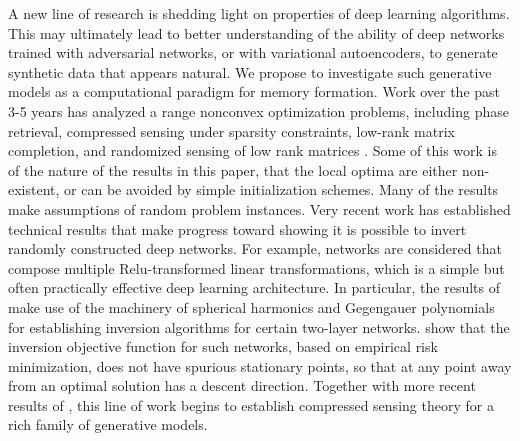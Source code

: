 A new line of research is shedding light on properties of deep
learning algorithms. This may ultimately lead to better understanding
of the ability of deep networks trained with adversarial networks, or
with variational autoencoders, to generate synthetic data that appears
natural. We propose to investigate such generative models as a
computational paradigm for memory formation. 
Work over the past 3-5 years has analyzed a range nonconvex
optimization problems, including phase retrieval, compressed
sensing under sparsity constraints, low-rank matrix
completion, and randomized sensing of low rank matrices
\cite{phaselift_1,phaselift_2,phaselift_3,ZhaWanLiu15,WeiCaiCha16,ZheLaf15,phaselift_1,phaselift_2,phaselift_3,ZhaWanLiu15,WeiCaiCha16}.
Some of this work is of the nature of the results in this
paper, that the local optima are either non-existent, or
can be avoided by simple initialization schemes. Many of
the results make assumptions of random problem instances.
Very recent work has established technical results
that make progress toward showing it is possible to invert randomly constructed
deep networks. For example, networks are considered that compose multiple Relu-transformed linear transformations,
which is a simple but often practically effective  deep learning architecture.
In particular, the results of \cite{Mixon18} make use of the machinery
of spherical harmonics and Gegengauer polynomials for establishing
inversion algorithms for certain two-layer networks.
\cite{HandV17} show that the inversion objective function for such networks, based
on empirical risk minimization, does not have spurious stationary points,
so that at any point away from an optimal solution has a descent
direction. Together with more recent results of \cite{HandV18},
this line of work begins to establish compressed sensing theory
for a rich family of generative models. 


